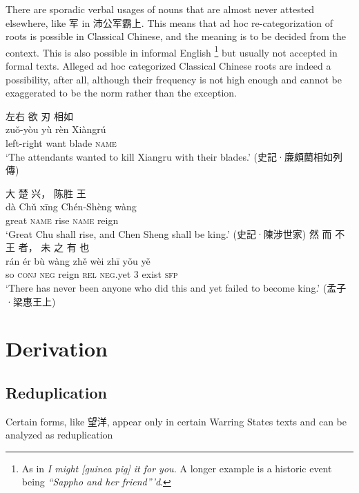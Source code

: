 \documentclass[UTF8, a4paper, oneside, scheme=plain, 12pt]{ctexrep}
\newcommand*{\citepages}[1]{pp.~{#1}}
\newcommand{\form}[1]{\emph{#1}}
\newcommand{\translate}[1]{`#1'}
\newcommand*{\category}[1]{\textsc{#1}}
\begin{document}
There are sporadic verbal usages of nouns that are almost never attested elsewhere,
like 军 in 沛公军霸上.
This means that ad hoc re-categorization of roots is possible in Classical Chinese,
and the meaning is to be decided from the context.
This is also possible in informal English%
\footnote{
    As in \form{I might [guinea pig] it for you.}
    A longer example is a historic event being \form{``Sappho and her friend'''d}.
} 
but usually not accepted in formal texts.
Alleged ad hoc categorized Classical Chinese roots are indeed a possibility, after all,
although their frequency is not high enough and cannot be exaggerated to be the norm rather than the exception.

\begin{exe}
    \ex
    \glll 左右 欲 刃 相如 \\
    zuǒ-yòu yù rèn Xiàngrú \\
    left-right want blade \category{name} \\
    \glt\translate{The attendants wanted to kill Xiangru with their blades.} \hfill (史記·廉頗藺相如列傳)
\end{exe}

\begin{exe}
    \ex
    \glll 大 楚 兴， 陈胜 王 \\
    dà Chǔ xīng Chén-Shèng wàng \\
    great \category{name} rise \category{name} reign \\
    \glt\translate{Great Chu shall rise, and Chen Sheng shall be king.} \hfill (史記·陳涉世家)
    \ex
    \glll 然 而 不 王 者， 未 之 有 也 \\
    rán ér bù wàng zhě wèi zhī yǒu yě \\
    so \category{conj} \category{neg} reign \category{rel} \category{neg}.yet 3 exist \category{sfp} \\
    \glt\translate{There has never been anyone who did this and yet failed to become king.} \hfill (孟子·梁惠王上)
\end{exe}


\section{Derivation}

\subsection{Reduplication}

Certain forms, like 望洋, appear only in certain Warring States texts and can be analyzed as reduplication \citep[\citepages{77-81}]{sun2008reduplication}
\end{document}
